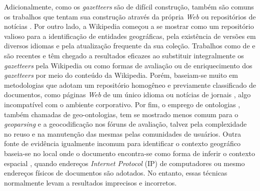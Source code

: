 Adicionalmente, como os \textit{gazetteers} são de difícil construção, também são comuns os trabalhos que tentam sua construção através da própria \textit{Web} ou repositórios de notícias \cite{gouveaMsc09}. Por outro lado, a Wikipedia começou a se mostrar como um repositório valioso para a identificação de entidades geográficas, pela existência de versões em diversos idiomas e pela atualização frequente da sua coleção. Trabalhos como de  e  são recentes e têm chegado a resultados eficazes ao substituir integralmente os \textit{gazetteers} pela Wikipedia ou como formas de avaliação ou de enriquecimento dos \textit{gazetteers} por meio do conteúdo da Wikipedia. Porém, baseiam-se muito em metodologias que adotam um repositório homogêneo e previamente classificado de documentos, como páginas \textit{Web} de um único idioma ou notícias de jornais \cite{gouveaMsc09,hassan09}, algo incompatível com o ambiente corporativo. Por fim, o emprego de ontologias \cite{chavesPhd09}, também chamadas de geo-ontologias, tem se mostrado menos comum para o \textit{geoparsing} e a geocodificação nos fóruns de avaliação, talvez pela complexidade no reuso e na manutenção das mesmas pelas comunidades de usuários. Outra fonte de evidência igualmente incomum para identificar o contexto geográfico baseia-se no local onde o documento encontra-se como forma de inferir o contexto espacial \cite{amitay04}, quando endereços \textit{Internet Protocol} (IP) de computadores ou mesmo endereços físicos de documentos são adotados. No entanto, essas técnicas normalmente levam a resultados imprecisos e incorretos.




